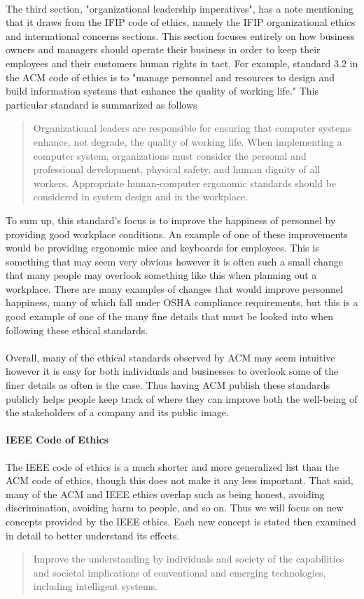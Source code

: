 \documentclass[notitlepage,a4paper,12pt]{article}
\begin{document}
\paragraph{}The third section, "organizational leadership imperatives", has a note mentioning that it draws from the IFIP code of ethics, namely the IFIP organizational ethics and international concerns sections. This section focuses entirely on how business owners and managers should operate their business in order to keep their employees and their customers human rights in tact. For example, standard 3.2 in the ACM code of ethics is to "manage personnel and resources to design and build information systems that enhance the quality of working life." This particular standard is summarized as follows
	\begin{quote}
	Organizational leaders are responsible for ensuring that computer systems enhance, not degrade, the quality of working life. When implementing a computer system, organizations must consider the personal and professional development, physical safety, and human dignity of all workers. Appropriate human-computer ergonomic standards should be considered in system design and in the workplace.
	\end{quote}
To sum up, this standard's focus is to improve the happiness of personnel by providing good workplace conditions. An example of one of these improvements would be providing ergonomic mice and keyboards for employees. This is something that may seem very obvious however it is often such a small change that many people may overlook something like this when planning out a workplace. There are many examples of changes that would improve personnel happiness, many of which fall under OSHA compliance requirements, but this is a good example of one of the many fine details that must be looked into when following these ethical standards.
\paragraph{}Overall, many of the ethical standards observed by ACM may seem intuitive however it is easy for both individuals and businesses to overlook some of the finer details as often is the case. Thus having ACM publish these standards publicly helps people keep track of where they can improve both the well-being of the stakeholders of a company and its public image.
\paragraph{IEEE Code of Ethics}The IEEE code of ethics is a much shorter and more generalized list than the ACM code of ethics, though this does not make it any less important. That said, many of the ACM and IEEE ethics overlap such as being honest, avoiding discrimination, avoiding harm to people, and so on. Thus we will focus on new concepts provided by the IEEE ethics. Each new concept is stated then examined in detail to better understand its effects.
	\begin{quote}
	Improve the understanding by individuals and society of the capabilities and societal implications of conventional and emerging technologies, including intelligent systems.
	\end{quote}
\end{document}
